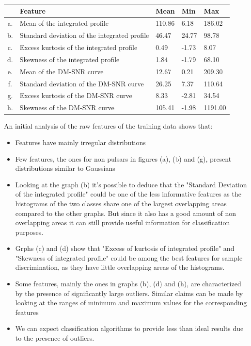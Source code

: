 \documentclass[12pt,a4paper]{article}
\begin{document}
\begin{minipage}{\linewidth}
    \begin{tabular}{ |c|p{220pt}|p{34pt}|p{30pt}|p{36pt}|  }\hline

           & Feature                                      & Mean   & Min   & Max     \\
        \hline
        a. & Mean of the integrated profile               & 110.86 & 6.18  & 186.02  \\
        \hline
        b. & Standard deviation of the integrated profile & 46.47  & 24.77 & 98.78   \\
        \hline
        c. & Excess kurtosis of the integrated profile    & 0.49   & -1.73 & 8.07    \\
        \hline
        d. & Skewness of the integrated profile           & 1.84   & -1.79 & 68.10   \\
        \hline
        e. & Mean of the DM-SNR curve                     & 12.67  & 0.21  & 209.30  \\
        \hline
        f. & Standard deviation of the DM-SNR curve       & 26.25  & 7.37  & 110.64  \\
        \hline
        g. & Excess kurtosis of the DM-SNR curve          & 8.33   & -2.81 & 34.54   \\
        \hline
        h. & Skewness of the DM-SNR curve                 & 105.41 & -1.98 & 1191.00 \\
        \hline
    \end{tabular}
\end{minipage}
\vspace{1cm}

An initial analysis of the raw features of the training data shows that:
\begin{itemize}
    \item Features have mainly irregular distributions
    \item Few features, the ones for non pulsars in figures (a), (b) and (g), present distributions similar to Gaussians
    \item Looking at the graph (b) it's possible to deduce that the "Standard Deviation of the integrated profile" could be one of the less informative features as the histograms of the two classes share one of the largest overlapping areas compared to the other graphs. But since it also has a good amount of non overlapping areas it can still provide useful information for classification purposes.
    \item Grphs (c) and (d) show that "Excess of kurtosis of integrated profile" and "Skewness of integrated profile" could be among the best features for sample discrimination, as they have little overlapping areas of the histograms.
    \item Some features, mainly the ones in graphs (b), (d) and (h), are characterized by the presence of significantly large outliers. Similar claims can be made by looking at the ranges of minimum and maximum values for the corresponding features
    \item We can expect classification algorithms to provide less than ideal results due to the presence of outliers.
\end{itemize}
\end{document}
